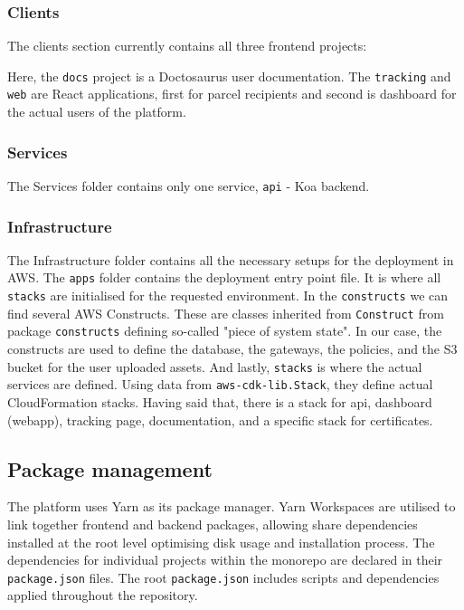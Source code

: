 \subsubsection{Clients}
The clients section currently contains all three frontend projects:

Here, the \texttt{docs} project is a Doctosaurus user documentation. The \texttt{tracking} and \texttt{web} are React applications, first for parcel recipients and second is dashboard for the actual users of the platform.

\subsubsection{Services}
The Services folder contains only one service, \texttt{api} - Koa backend.

\subsubsection{Infrastructure}
The Infrastructure folder contains all the necessary setups for the deployment in \ac{AWS}.
The \texttt{apps} folder contains the deployment entry point file. It is where all \texttt{stacks} are initialised for the requested environment.
In the \texttt{constructs} we can find several AWS Constructs.
These are classes inherited from \texttt{Construct} from package \texttt{constructs} defining so-called "piece of system state".
In our case, the constructs are used to define the database, the gateways, the policies, and the S3 bucket for the user uploaded assets.
And lastly, \texttt{stacks} is where the actual services are defined.
Using data from \texttt{aws-cdk-lib.Stack}, they define actual CloudFormation stacks.
Having said that, there is a stack for api, dashboard (webapp), tracking page, documentation, and a specific stack for certificates.



\subsection{Package management}
The platform uses Yarn as its package manager.
Yarn Workspaces are utilised to link together frontend and backend packages, allowing share dependencies installed at the root level optimising disk usage and installation process.
The dependencies for individual projects within the monorepo are declared in their \texttt{package.json} files.
The root \texttt{package.json} includes scripts and dependencies applied throughout the repository.

